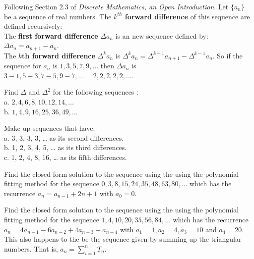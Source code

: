 
Following Section 2.3 of  {\it Discrete Mathematics, an Open Introduction}.  Let $\{a_n\}$ be a sequence of real numbers.  The {\bf $k^{th}$ forward difference} of this sequence are defined recursively:\\
The {\bf first forward difference} $\Delta a_n$ is an new sequence defined by:$\Delta a_n=a_{n+1}-a_{n}$.\\
The {\bf $k$th forward difference} $\Delta^{k} a_n$ is $\Delta^{k} a_n=\Delta^{k-1} a_{n+1}- \Delta^{k-1}a_{n}$.  So if the sequence for $a_n$ is $1,3,5,7,9, \ldots$ then  $\Delta a_n$ is $3-1,5-3,7-5,9-7, \ldots= 2,2,2,2,2, \ldots$.

\begin{exercise}
Find $\Delta$ and $\Delta^2$ for the following sequences :\\
a. $2, 4, 6, 8, 10, 12, 14, \ldots$\\
b.  $1, 4, 9, 16, 25, 36, 49, \ldots$
\end{exercise}

\begin{exercise}
Make up sequences that have:\\
a. 3, 3, 3, 3, … as its second differences.\\
b. 1, 2, 3, 4, 5, … as its third differences.\\
c. 1, 2, 4, 8, 16, … as its fifth differences.\\
\end{exercise}



\begin{exercise}
Find the closed form solution to the sequence using the using the polynomial fitting method for the sequence $0, 3, 8, 15, 24, 35, 48, 63, 80,\ldots$ which has the recurrence $a_n = a_{n-1} + 2n+1$ with $a_0=0$.
\end{exercise}

\begin{exercise}
Find the closed form solution to the sequence using the using the polynomial fitting method for the sequence $1, 4, 10, 20, 35, 56, 84,\ldots$ which has the recurrence $a_n = 4a_{n-1} - 6a_{n-2} + 4a_{n-3} - a_{n-4}$ with $a_1=1, a_2=4, a_3=10$ and $a_4=20$.  This also happens to the be the sequence given by summing up the triangular numbers.  That is, $a_n=\sum_{i=1}^n T_n$.
\end{exercise}

